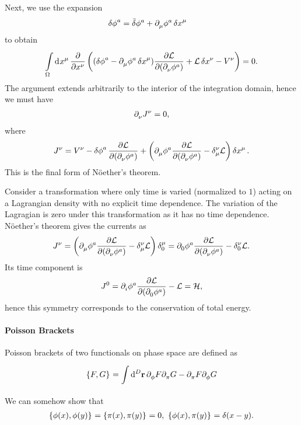 Next, we use the expansion
\begin{align*}
	\var{\phi}^{a}  &= \bar{\delta}\phi^{a} + \partial^{}_{\mu}\phi^{a}\var{x}^{\mu}
\end{align*}
to obtain
\begin{align*}
	\int\limits_{\Omega}^{}\dd[]{x^{\mu}}\pdv{x^{\nu}}\left((\var{\phi}^{a} - \partial^{}_{\mu}\phi^{a}\var{x}^{\mu})\pdv{\ensuremath{\mathcal{L}}}{(\partial^{}_{\nu}\phi^{a})} + \mathcal{L}\var{x^{\nu}} - V^{\nu}\right) = 0.
\end{align*}
The argument extends arbitrarily to the interior of the integration domain, hence we must have
\begin{align*}
	\partial^{}_{\nu}J^{\nu} = 0,
\end{align*}
where
\begin{align*}
	J^{\nu} = V^{\nu} - \var{\phi}^{a}\pdv{\ensuremath{\mathcal{L}}}{(\partial^{}_{\nu}\phi^{a})} + \left(\partial^{}_{\mu}\phi^{a}\pdv{\ensuremath{\mathcal{L}}}{(\partial^{}_{\nu}\phi^{a})} - \delta_{\mu}^{\nu}\mathcal{L}\right)\var{x^{\mu}}.
\end{align*}
This is the final form of Nöether's theorem.

Consider a transformation where only time is varied (normalized to $1$) acting on a Lagrangian density with no explicit time dependence. The variation of the Lagragian is zero under this transformation as it has no time dependence. Nöether's theorem gives the currents as
\begin{align*}
	J^{\nu} = \left(\partial^{}_{\mu}\phi^{a}\pdv{\ensuremath{\mathcal{L}}}{(\partial^{}_{\nu}\phi^{a})} - \delta_{\mu}^{\nu}\mathcal{L}\right)\delta_{0}^{\mu} = \partial^{}_{0}\phi^{a}\pdv{\ensuremath{\mathcal{L}}}{(\partial^{}_{\nu}\phi^{a})} - \delta_{0}^{\nu}\mathcal{L}.
\end{align*}
Its time component is
\begin{align*}
	J^{0} = \partial^{}_{i}\phi^{a}\pdv{\ensuremath{\mathcal{L}}}{(\partial^{}_{0}\phi^{a})} - \mathcal{L} = \mathcal{H},
\end{align*}
hence this symmetry corresponds to the conservation of total energy.

\paragraph{Poisson Brackets}
Poisson brackets of two functionals on phase space are defined as
\begin{align*}
	\left\{F, G\right\}_{} = \int\limits_{}^{}\dd[D]{\vb{r}}\partial^{}_{\phi}F\partial^{}_{\pi}G - \partial^{}_{\pi}F\partial^{}_{\phi}G
\end{align*}
We can somehow show that
\begin{align*}
	\pob{\phi(x)}{\phi(y)} = \pob{\pi(x)}{\pi(y)} = 0,\ \pob{\phi(x)}{\pi(y)} = \delta(x - y).
\end{align*}